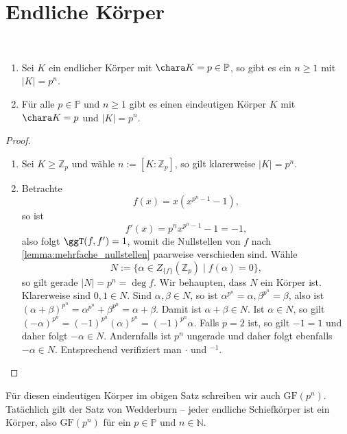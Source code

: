 \section{Endliche Körper}

\begin{theorem}{\ }
    \begin{enumerate}
        \item Sei $K$ ein endlicher Körper mit $\chara K = p \in \mathbb{P}$, so gibt es ein $n \geq 1$ mit $\vert K \vert = p^n$.
        \item Für alle $p \in \mathbb{P}$ und $n \geq 1$ gibt es einen eindeutigen Körper $K$ mit $\chara K = p$ und $\vert K \vert = p^n$.
    \end{enumerate}
\end{theorem}

\begin{proof}{\ }
    \begin{enumerate}
        \item Sei $K \geq \mathbb{Z}_p$ und wähle $n := [K : \mathbb{Z}_p]$, so gilt klarerweise $\vert K \vert = p^n$.
        \item Betrachte
        $$ f(x) = x(x^{p^n - 1} - 1), $$
        so ist
        $$ f'(x) = p^n x^{p^n - 1} - 1 = -1, $$
        also folgt $\ggT(f, f') = 1$, womit die Nullstellen von $f$ nach \cref*{lemma:mehrfache_nullstellen} paarweise verschieden sind. Wähle
        $$ N := \{ \alpha \in Z_{\{f\}}(\mathbb{Z}_p) \mid f(\alpha) = 0 \}, $$
        so gilt gerade $\vert N \vert = p^n = \deg f$. Wir behaupten, dass $N$ ein Körper ist. Klarerweise sind $0, 1 \in N$. Sind $\alpha, \beta \in N$, so ist $\alpha^{p^n} = \alpha, \beta^{p^n} = \beta$, also ist $(\alpha + \beta)^{p^n} = \alpha^{p^n} + \beta^{p^n} = \alpha + \beta$. Damit ist $\alpha + \beta \in N$. 
        Ist $\alpha\in N$, so gilt $(-\alpha)^{p^n}=(-1)^{p^n}(\alpha)^{p^n}=(-1)^{p^n}\alpha$. Falls $p=2$ ist, so gilt $-1=1$ und daher folgt $-\alpha\in N$. Andernfalls ist $p^n$ ungerade und daher folgt ebenfalls $-\alpha\in N$.
        Entsprechend verifiziert man $\cdot$ und ${}^{-1}$.
    \end{enumerate}
\end{proof}

\begin{remark}
    Für diesen eindeutigen Körper im obigen Satz schreiben wir auch $\mathrm{GF}(p^n)$. Tatächlich gilt der Satz von Wedderburn -- jeder endliche Schiefkörper ist ein Körper, also $\mathrm{GF}(p^n)$ für ein $p\in\mathbb{P}$ und $n\in\mathbb{N}$.
\end{remark}

